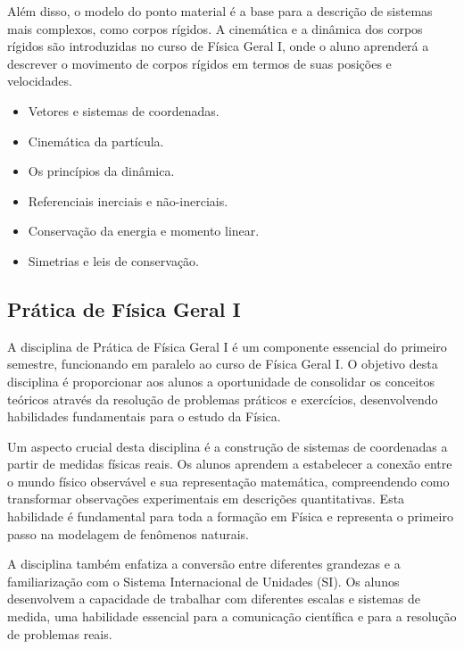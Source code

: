 \documentclass[a4paper, 12pt]{article}
\newcounter{fis}
\newcounter{mat}
\begin{document}
Além disso, o modelo do ponto material é a base para a descrição de sistemas
mais complexos, como corpos rígidos. A cinemática e a dinâmica dos corpos rígidos
são introduzidas no curso de Física Geral I, onde o aluno aprenderá a descrever o
movimento de corpos rígidos em termos de suas posições e velocidades.

\begin{tcolorbox}[title=Ementa:]
    \begin{itemize}
        \item Vetores e sistemas de coordenadas.
        \item Cinemática da partícula.
        \item Os princípios da dinâmica.
        \item Referenciais inerciais e não-inerciais.
        \item Conservação da energia e momento linear.
        \item Simetrias e leis de conservação.
    \end{itemize}
\end{tcolorbox}

\subsection{Prática de Física Geral I}
\label{fis002}

A disciplina de Prática de Física Geral I é um componente essencial do primeiro
semestre, funcionando em paralelo ao curso de Física Geral I. O objetivo desta
disciplina é proporcionar aos alunos a oportunidade de consolidar os conceitos teóricos
através da resolução de problemas práticos e exercícios, desenvolvendo habilidades
fundamentais para o estudo da Física.

Um aspecto crucial desta disciplina é a construção de sistemas de coordenadas a partir
de medidas físicas reais. Os alunos aprendem a estabelecer a conexão entre o mundo
físico observável e sua representação matemática, compreendendo como transformar
observações experimentais em descrições quantitativas. Esta habilidade é fundamental
para toda a formação em Física e representa o primeiro passo na modelagem de fenômenos
naturais.

A disciplina também enfatiza a conversão entre diferentes grandezas e a familiarização
com o Sistema Internacional de Unidades (SI). Os alunos desenvolvem a capacidade de
trabalhar com diferentes escalas e sistemas de medida, uma habilidade essencial para a
comunicação científica e para a resolução de problemas reais.
\end{document}
